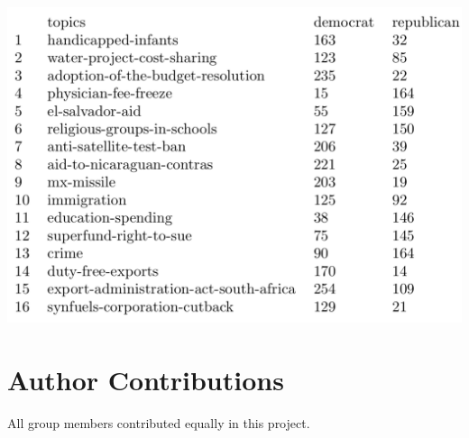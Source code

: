 \documentclass{article}
\begin{document}
\pagebreak

\includegraphics[scale=0.5]{ending_votes.png}

\section{Author Contributions}
All group members contributed equally in this project.
\end{document}
